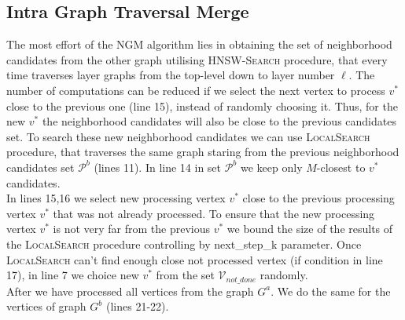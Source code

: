 \documentclass{article}
\begin{document}
\subsection{Intra Graph Traversal Merge}
The most effort of the \textsc{NGM} algorithm lies in obtaining the set of neighborhood candidates from the other graph utilising \textsc{HNSW-Search} procedure, that every time traverses layer graphs from the top-level down to layer number $\ell$. The number of computations can be reduced if we select the next vertex to process $v^*$ close to the previous one (line 15), instead of randomly choosing it. Thus, for the new $v^*$ the neighborhood candidates will also be close to the previous candidates set. To search these new neighborhood candidates we can use \textsc{LocalSearch} procedure, that traverses the same graph staring from the previous neighborhood candidates set $\mathcal{P}^b$ (lines 11). In line 14 in set $\mathcal{P}^b$ we keep only $M$-closest to $v^*$ candidates.\\
In lines 15,16 we select new processing vertex $v^*$  close to the previous processing vertex $v^*$ that was not already processed.  
To ensure that the new processing vertex $v^*$ is not very far from the previous $v^*$ we bound the size of the results of the \textsc{LocalSearch} procedure controlling by next\_step\_k parameter. Once \textsc{LocalSearch} can't find enough close not processed vertex (if condition in line 17), in line 7 we choice new $v^*$ from the set $\mathcal{V}_{not\_done}$ randomly. \\
After we have processed all vertices from the graph $G^a$. We do the same for the vertices of graph $G^b$ (lines 21-22).  
\end{document}
